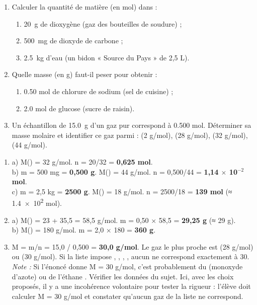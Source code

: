 \documentclass[11pt]{article}
\begin{document}
\begin{exercice}[Entraînement — n = m/M]
\begin{enumerate}
\item Calculer la quantité de matière (en mol) dans : 
      \begin{enumerate}
      \item \SI{20}{g} de dioxygène  (gaz des bouteilles de soudure) ;
      \item \SI{500}{mg} de dioxyde de carbone  ;
      \item \SI{2,5}{kg} d'eau (un bidon « Source du Pays » de 2,5 L).
      \end{enumerate}
\item Quelle masse (en g) faut-il peser pour obtenir : 
      \begin{enumerate}
      \item \num{0,50} mol de chlorure de sodium  (sel de cuisine) ;
      \item \num{2,0} mol de glucose  (sucre de raisin).
      \end{enumerate}
\item Un échantillon de \SI{15,0}{g} d'un gaz pur correspond à \num{0,500} mol. Déterminer sa masse molaire et identifier ce gaz parmi :  (2 g/mol),  (28 g/mol),  (32 g/mol),  (44 g/mol).
\end{enumerate}
\end{exercice}

\begin{corrige}
\begin{enumerate}
\item a) M() = 32 g/mol. n = 20/32 = \textbf{0,625 mol}. \\
      b) m = 500 mg = \textbf{0,500 g}. M() = 44 g/mol. n = 0,500/44 = \textbf{1,14 $\times$ 10$^{-2}$ mol}. \\
      c) m = 2,5 kg = \textbf{2500 g}. M() = 18 g/mol. n = 2500/18 = \textbf{139 mol} (≈ \num{1,4e2} mol).
\item a) M() = 23 + 35,5 = 58,5 g/mol. m = 0,50 × 58,5 = \textbf{29,25 g} (≈ 29 g). \\
      b) M() = 180 g/mol. m = 2,0 × 180 = \textbf{360 g}.
\item M = m/n = 15,0 / 0,500 = \textbf{30,0 g/mol}. Le gaz le plus proche est  (28 g/mol) ou  (30 g/mol). Si la liste impose , , , , aucun ne correspond exactement à 30. \emph{Note :} Si l'énoncé donne M = 30 g/mol, c'est probablement du  (monoxyde d'azote) ou de l'éthane . Vérifier les données du sujet. Ici, avec les choix proposés, il y a une incohérence volontaire pour tester la rigueur : l'élève doit calculer M = 30 g/mol et constater qu'aucun gaz de la liste ne correspond.
\end{enumerate}
\end{corrige}
\end{document}
